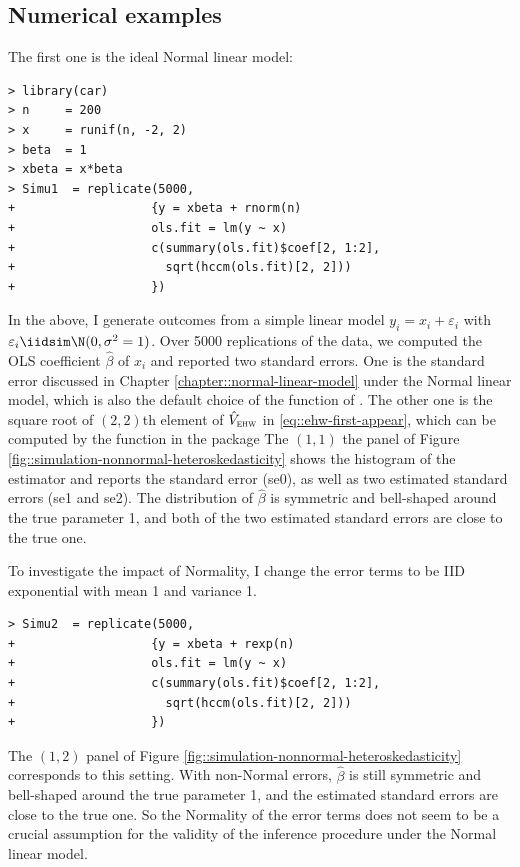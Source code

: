 \subsection{Numerical examples}

The  first one is the ideal Normal linear model:

\begin{lstlisting}
> library(car)
> n     = 200
> x     = runif(n, -2, 2)
> beta  = 1
> xbeta = x*beta 
> Simu1  = replicate(5000,
+                   {y = xbeta + rnorm(n)
+                   ols.fit = lm(y ~ x)
+                   c(summary(ols.fit)$coef[2, 1:2],
+                     sqrt(hccm(ols.fit)[2, 2]))
+                   })
\end{lstlisting}

In the above, I generate outcomes from a simple linear model $y_i = x_i + \varepsilon_i$ with $\varepsilon_i\iidsim \N(0,\sigma^2=1)$. Over 5000 replications of the data, we computed the OLS coefficient $\hat{\beta}$ of $x_i$ and reported two standard errors. One is the standard error discussed in Chapter \ref{chapter::normal-linear-model} under the Normal linear model, which is also the default choice of the  function of . The other one is the square root of $(2,2)$th element of $\hat{V}_{\textsc{ehw}}$ in \eqref{eq::ehw-first-appear}, which can be computed by the  function in the  package  The $(1,1)$ the panel of
Figure \ref{fig::simulation-nonnormal-heteroskedasticity} shows the histogram of the estimator and reports the standard error (se0), as well as two estimated standard errors (se1 and se2). The distribution of $\hat{\beta}$ is symmetric and bell-shaped around the true parameter 1, and both of the two estimated standard errors are close to the true one. 

To investigate the impact of Normality, I change the error terms to be IID exponential with mean 1 and variance 1. 

\begin{lstlisting}
> Simu2  = replicate(5000,
+                   {y = xbeta + rexp(n)
+                   ols.fit = lm(y ~ x)
+                   c(summary(ols.fit)$coef[2, 1:2],
+                     sqrt(hccm(ols.fit)[2, 2]))
+                   })
\end{lstlisting}

The $(1,2)$ panel of Figure \ref{fig::simulation-nonnormal-heteroskedasticity} corresponds to this setting. With non-Normal errors, $\hat{\beta}$ is still symmetric and bell-shaped around the true parameter 1, and the estimated standard errors are close to the true one. So the Normality of the error terms does not seem to be a crucial assumption for the validity of the inference procedure under the Normal linear model. 




